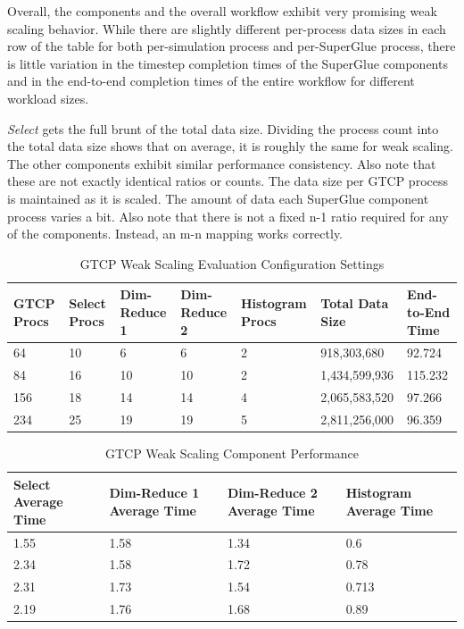 \documentclass[conference]{IEEEtran}
\begin{document}
Overall, the components and the overall workflow
exhibit very promising weak scaling behavior.
While there are slightly different per-process
data sizes in each row of the table for both
per-simulation process and per-SuperGlue process,
there is little variation in the timestep completion
times of the SuperGlue components and in the end-to-end
completion times of the entire workflow for different
workload sizes.

{\em Select} gets the full brunt of the total data size. Dividing the process
count into the total data size shows that on average, it is roughly the same
for weak scaling. The other components exhibit similar performance consistency.
Also note that these are not exactly identical ratios or counts.  The data size
per GTCP process is maintained as it is scaled. The amount of data each
SuperGlue component process varies a bit. Also note that there is not a fixed
n-1 ratio required for any of the components. Instead, an m-n mapping works
correctly.


\begin{table}[tbp]
\centering
\caption{GTCP Weak Scaling Evaluation Configuration Settings}
\label{tab:eval-weak-gtcp-1}
\vspace{-0.15in}
\begin{tabular}{|l|l|l|l|l|l|l|}
\hline
GTCP Procs & Select Procs & Dim-Reduce 1 & Dim-Reduce 2 & Histogram Procs & Total Data Size & End-to-End Time\\
\hline
64 & 10 & 6 & 6 & 2 & 918,303,680 & 92.724\\
\hline
84 & 16 & 10 & 10 & 2 & 1,434,599,936 & 115.232\\
\hline
156 & 18 & 14 & 14 & 4 & 2,065,583,520 & 97.266\\
\hline
234 & 25 & 19 & 19 & 5 & 2,811,256,000 & 96.359\\
\hline
\end{tabular}
\vspace{-0.15in}
\end{table}

\begin{table}[tbp]
\centering
\caption{GTCP Weak Scaling Component Performance}
\label{tab:eval-weak-gtcp-2}
\vspace{-0.15in}
\begin{tabular}{|p{0.67 in}|p{0.67 in}|p{0.67 in}|p{0.65 in}|}
\hline
Select Average Time & Dim-Reduce 1 Average Time & Dim-Reduce 2 Average Time & Histogram Average Time\\
\hline
1.55 & 1.58 & 1.34 & 0.6\\
\hline
2.34 & 1.58 & 1.72 & 0.78\\
\hline
2.31 & 1.73 & 1.54 & 0.713\\
\hline
2.19 & 1.76 & 1.68 & 0.89\\
\hline
\end{tabular}
\vspace{-0.25in}
\end{table}
\end{document}
